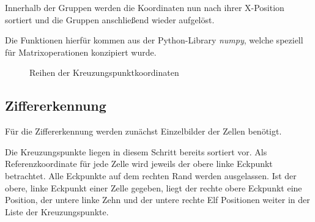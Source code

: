 Innerhalb der Gruppen werden die Koordinaten nun nach ihrer X-Position sortiert und die Gruppen anschließend wieder aufgelöst.

Die Funktionen hierfür kommen aus der Python-Library \emph{numpy}, welche speziell für Matrixoperationen konzipiert wurde.

\begin{figure}[h!]
    \hfill
    \caption{Reihen der Kreuzungspunktkoordinaten}
\end{figure}


\subsection{Ziffererkennung}
Für die Ziffererkennung werden zunächst Einzelbilder der Zellen benötigt.

Die Kreuzungspunkte liegen in diesem Schritt bereits sortiert vor.
Als Referenzkoordinate für jede Zelle wird jeweils der obere linke Eckpunkt betrachtet. Alle Eckpunkte auf dem rechten Rand werden ausgelassen.
Ist der obere, linke Eckpunkt einer Zelle gegeben, liegt der rechte obere Eckpunkt eine Position, der untere linke Zehn und der untere rechte Elf Positionen weiter in der Liste der Kreuzungspunkte.


